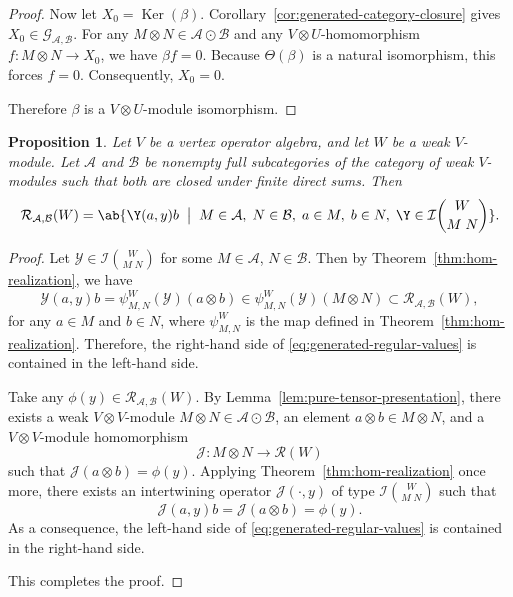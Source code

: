 \documentclass[12pt, english]{article}
\numberwithin{equation}{section}
\DeclareMathOperator{\Ker}{Ker}
\theoremstyle{plain}
\newtheorem{proposition}[lemma]{Proposition}
\theoremstyle{definition}
\theoremstyle{remark}
\begin{document}
\begin{proof}
		Now let $X_0 = \Ker(\beta)$. Corollary~\ref{cor:generated-category-closure} gives
		$X_0 \in \mathcal{G}_{\mathcal{A}, \mathcal{B}}$.
		For any $M \otimes N \in \mathcal{A}\odot\mathcal{B}$ and any $V \otimes U$-homomorphism
		$f \colon M \otimes N \to X_0$, we have $\beta f = 0$.
		Because $\Theta(\beta)$ is a natural isomorphism,
		this forces $f = 0$.
		Consequently, $X_0 = 0$.
		
		Therefore $\beta$ is a $V\otimes U$-module isomorphism.
		
		
		
	\end{proof}
	
	\vspace{0.2cm}
	
	\begin{proposition} \label{prop:generated-regular-values}
		Let $V$ be a vertex operator algebra, and let $W$ be a weak $V$-module.
		Let $\mathcal{A}$ and $\mathcal{B}$ be nonempty full subcategories of the category of weak $V$-modules such that both are closed under finite direct sums.
		Then
		\begin{align} \label{eq:generated-regular-values}
			\mathcal{R}_{\mathcal{A}, \mathcal{B}} (W)
			= \ab\{ \Y(a, y) b \; \bigm| \; M \in \mathcal{A}, \; N \in \mathcal{B}, \; a \in M, \; b \in N, \;\Y \in \mathcal{I}\binom{W}{M\; N} \}.
		\end{align}
	\end{proposition}
	
	\begin{proof}
		
		Let $\mathcal{Y} \in \mathcal{I}\binom{W}{M \; N} $ for some $M \in \mathcal{A}$, $N \in \mathcal{B}$.
		Then by Theorem~\ref{thm:hom-realization}, we have
		\[
		\mathcal{Y}(a, y) b = \psi^W_{M, N}(\mathcal{Y}) (a \otimes b) \in \psi^W_{M, N}(\mathcal{Y}) (M \otimes N) \subset \mathcal{R}_{\mathcal{A}, \mathcal{B}}(W),
		\]
		for any $a \in M$ and $b \in N$, where $\psi^W_{M, N}$ is the map defined in Theorem~\ref{thm:hom-realization}. Therefore, the right-hand side of \eqref{eq:generated-regular-values} is contained in the left-hand side.
		
		Take any $\phi(y) \in \mathcal{R}_{\mathcal{A}, \mathcal{B}}(W)$.
		By Lemma~\ref{lem:pure-tensor-presentation}, there exists a weak $V \otimes V$-module $M \otimes N \in \mathcal{A} \odot \mathcal{B}$, an element $a \otimes b \in M \otimes N$,
		and a $V \otimes V$-module homomorphism
		\[
		\mathcal{J} \colon M \otimes N \longrightarrow \mathcal{R}(W)
		\]
		such that $\mathcal{J}(a \otimes b) = \phi(y)$. Applying Theorem~\ref{thm:hom-realization} once more,
		there exists an intertwining operator $\mathcal{J}(\cdot, y)$ of type $\mathcal{I} \binom{W}{M\; N}$ such that
		\[
		\mathcal{J}(a, y) b = \mathcal{J}(a \otimes b) = \phi(y).
		\]
		As a consequence, the left-hand side of \eqref{eq:generated-regular-values} is contained in the right-hand side.
		
		This completes the proof.
		
	\end{proof}
	
\end{document}

